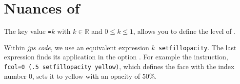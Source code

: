 \section{Nuances of }

The key value \texttt{=$k$} with $k \in \mathbb{R}$ and $0\leq
k\leq 1$, allows you to define the level of .

Within \textit{jps code}, we use an equivalent expression
\texttt{$k$ setfillopacity}. The last expression finds its application in the option . For example the instruction,
\verb+fcol=0 (.5 setfillopacity yellow)+,
which defines the face with the index number 0, sets it to yellow with an opacity of 50\%.

\endinput
